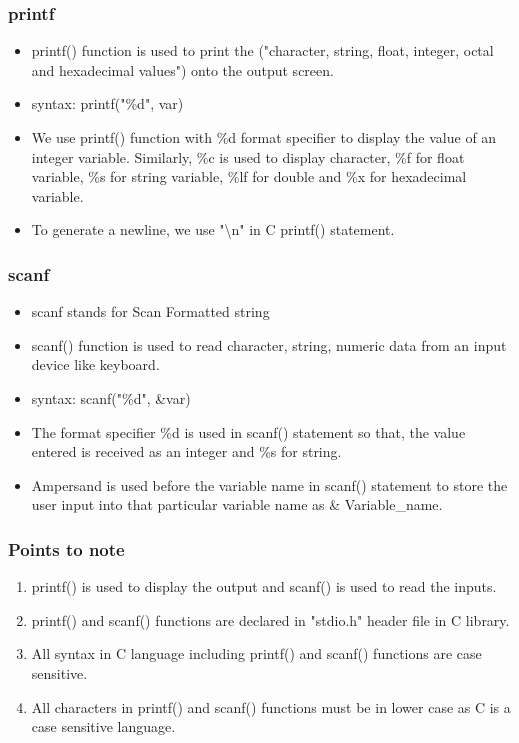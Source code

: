 \subsubsection{printf}
\begin{itemize}
    \item printf() function is used to print the ("character, string, float, integer, octal and hexadecimal values") onto the output screen.
    \item syntax: printf("\%d", var)
    \item We use printf() function with \%d format specifier to display the value of an integer variable. Similarly, \%c is used to display character, \%f for float variable, \%s for string variable, \%lf for double and \%x for hexadecimal variable.
    \item To generate a newline, we use "\textbackslash n" in C printf() statement.
\end{itemize}

\subsubsection{scanf}
\begin{itemize}
    \item scanf stands for Scan Formatted string
    \item scanf() function is used to read character, string, numeric data from an input device like keyboard.
    \item syntax: scanf("\%d", \&var)
    \item The format specifier \%d is used in scanf() statement so that, the value entered is received as an integer and \%s for string.
    \item Ampersand is used before the variable name in scanf() statement to store the user input into that particular variable name as \& Variable\_name.
\end{itemize}    

\subsubsection{Points to note}
\begin{enumerate}
    \item printf() is used to display the output and scanf() is used to read the inputs.
    \item printf() and scanf() functions are declared in "stdio.h" header file in C library.
    \item All syntax in C language including printf() and scanf() functions are case sensitive.
    \item All characters in printf() and scanf() functions must be in lower case as C is a case sensitive language.
\end{enumerate}



